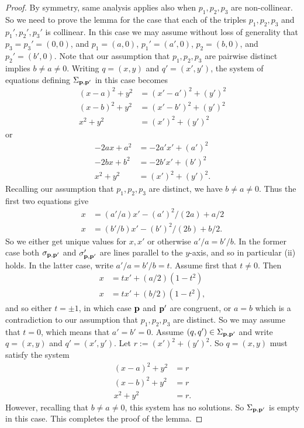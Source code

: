 \documentclass[letterpaper, reqno,11pt]{article}
\newcommand{\p}{{\bf p}}
\theoremstyle{definition}
\theoremstyle{remark}
\begin{document}
\begin{proof}
By symmetry, same analysis applies also when $p_1,p_2,p_3$ are non-collinear. 
So we need to prove the lemma for the case that each of the triples $p_1,p_2,p_3$ and $p_1',p_2',p_3'$ is collinear. In this case we may assume without loss of generality that $p_3=p_3'=(0,0)$, and $p_1=(a,0)$, $p_1'=(a',0)$, $p_2=(b,0)$, and $p_2'=(b',0)$. Note that our assumption that $p_1,p_2,p_3$ are pairwise distinct implies $b\neq a\neq 0$. Writing $q=(x,y)$ and $q'=(x',y')$, the system of equations defining $\Sigma_{\p,\p'}$ in this case becomes
\begin{align*}
(x-a)^2+y^2&=(x'-a')^2+(y')^2\\
(x-b)^2+y^2&=(x'-b')^2+(y')^2\\
x^2+y^2&=(x')^2+(y')^2
\end{align*}
or
\begin{align*}
-2ax+a^2&=-2a'x'+(a')^2\\
-2bx+b^2&=-2b'x'+(b')^2\\
x^2+y^2&=(x')^2+(y')^2.
\end{align*}
Recalling our assumption that $p_1,p_2,p_3$ are distinct, we have $b\neq a\neq 0$. Thus the first two equations give 
\begin{align*}
x&=(a'/a)x'-(a')^2/(2a)+a/2\\
x&=(b'/b)x'-(b')^2/(2b)+b/2.
\end{align*}
So we either get unique values for $x,x'$ or otherwise $a'/a=b'/b$. In the former case both $\sigma_{\p,\p'}$ and $\sigma'_{\p,\p'}$  are lines parallel to the $y$-axis, and so in particular (ii) holds. 
In the latter case, write $a'/a=b'/b=t$. Assume first that $t\neq 0$. Then 
\begin{align*}
x&=tx'+(a/2)(1-t^2)\\
x&=tx'+(b/2)(1-t^2),
\end{align*}
and so either $t=\pm 1$, in which case $\p$ and $\p'$ are congruent, or $a=b$ which is a contradiction to our assumption that $p_1,p_2,p_3$ are distinct. 
So we may assume that $t=0$, which means that $a'=b'=0$. 
Assume $(q,q')\in \Sigma_{\p,\p'}$ and write $q=(x,y)$ and $q'=(x',y')$. 
Let $r:=(x')^2+(y')^2$. So $q=(x,y)$ must satisfy the system
\begin{align*}
(x-a)^2+y^2&=r\\
(x-b)^2+y^2&=r\\
x^2+y^2&=r.
\end{align*}
However, recalling that $b\neq a\neq 0$, this system has no solutions. So $\Sigma_{\p,\p'}$ is empty in this case. This completes the proof of the lemma. 
\end{proof}
\end{document}
